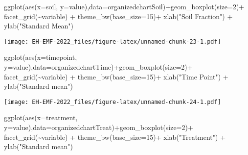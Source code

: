 \documentclass[
]{article}
\newenvironment{Shaded}{\begin{snugshade}}{\end{snugshade}}
\newcommand{\AttributeTok}[1]{\textcolor[rgb]{0.77,0.63,0.00}{#1}}
\newcommand{\DecValTok}[1]{\textcolor[rgb]{0.00,0.00,0.81}{#1}}
\newcommand{\FunctionTok}[1]{\textcolor[rgb]{0.00,0.00,0.00}{#1}}
\newcommand{\NormalTok}[1]{#1}
\newcommand{\SpecialCharTok}[1]{\textcolor[rgb]{0.00,0.00,0.00}{#1}}
\newcommand{\StringTok}[1]{\textcolor[rgb]{0.31,0.60,0.02}{#1}}
\begin{document}
\begin{Shaded}
\begin{Highlighting}[]
\FunctionTok{ggplot}\NormalTok{(}\FunctionTok{aes}\NormalTok{(}\AttributeTok{x=}\NormalTok{soil, }\AttributeTok{y=}\NormalTok{value),}\AttributeTok{data=}\NormalTok{organizedchartSoil)}\SpecialCharTok{+}\FunctionTok{geom\_boxplot}\NormalTok{(}\AttributeTok{size=}\DecValTok{2}\NormalTok{)}\SpecialCharTok{+}
  \FunctionTok{facet\_grid}\NormalTok{(}\SpecialCharTok{\textasciitilde{}}\NormalTok{variable) }\SpecialCharTok{+}
  \FunctionTok{theme\_bw}\NormalTok{(}\AttributeTok{base\_size=}\DecValTok{15}\NormalTok{)}\SpecialCharTok{+}
  \FunctionTok{xlab}\NormalTok{(}\StringTok{"Soil Fraction"}\NormalTok{) }\SpecialCharTok{+}
  \FunctionTok{ylab}\NormalTok{(}\StringTok{"Standard Mean"}\NormalTok{)}
\end{Highlighting}
\end{Shaded}

\texttt{[image: EH-EMF-2022\_files/figure-latex/unnamed-chunk-23-1.pdf]}

\begin{Shaded}
\begin{Highlighting}[]
\FunctionTok{ggplot}\NormalTok{(}\FunctionTok{aes}\NormalTok{(}\AttributeTok{x=}\NormalTok{timepoint, }\AttributeTok{y=}\NormalTok{value),}\AttributeTok{data=}\NormalTok{organizedchartTime)}\SpecialCharTok{+}\FunctionTok{geom\_boxplot}\NormalTok{(}\AttributeTok{size=}\DecValTok{2}\NormalTok{)}\SpecialCharTok{+}
  \FunctionTok{facet\_grid}\NormalTok{(}\SpecialCharTok{\textasciitilde{}}\NormalTok{variable) }\SpecialCharTok{+}
  \FunctionTok{theme\_bw}\NormalTok{(}\AttributeTok{base\_size=}\DecValTok{15}\NormalTok{)}\SpecialCharTok{+}
  \FunctionTok{xlab}\NormalTok{(}\StringTok{"Time Point"}\NormalTok{) }\SpecialCharTok{+}
  \FunctionTok{ylab}\NormalTok{(}\StringTok{"Standard mean"}\NormalTok{)}
\end{Highlighting}
\end{Shaded}

\texttt{[image: EH-EMF-2022\_files/figure-latex/unnamed-chunk-24-1.pdf]}

\begin{Shaded}
\begin{Highlighting}[]
\FunctionTok{ggplot}\NormalTok{(}\FunctionTok{aes}\NormalTok{(}\AttributeTok{x=}\NormalTok{treatment, }\AttributeTok{y=}\NormalTok{value),}\AttributeTok{data=}\NormalTok{organizedchartTreat)}\SpecialCharTok{+}\FunctionTok{geom\_boxplot}\NormalTok{(}\AttributeTok{size=}\DecValTok{2}\NormalTok{)}\SpecialCharTok{+}
  \FunctionTok{facet\_grid}\NormalTok{(}\SpecialCharTok{\textasciitilde{}}\NormalTok{variable) }\SpecialCharTok{+}
  \FunctionTok{theme\_bw}\NormalTok{(}\AttributeTok{base\_size=}\DecValTok{15}\NormalTok{)}\SpecialCharTok{+}
  \FunctionTok{xlab}\NormalTok{(}\StringTok{"Treatment"}\NormalTok{) }\SpecialCharTok{+}
  \FunctionTok{ylab}\NormalTok{(}\StringTok{"Standard mean"}\NormalTok{)}
\end{Highlighting}
\end{Shaded}
\end{document}
